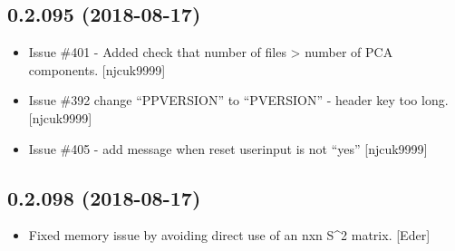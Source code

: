 \documentclass[a4paper,10pt,english]{report}
\begin{document}
\subsection{0.2.095 (2018-08-17)}
\label{\detokenize{misc/changelog:id364}}\begin{itemize}
\item {} 
Issue \#401 - Added check that number of  files \textgreater{} number of
PCA components. {[}njcuk9999{]}

\item {} 
Issue \#392 change “PPVERSION” to “PVERSION” - header key too long.
{[}njcuk9999{]}

\item {} 
Issue \#405 - add message when reset userinput is not “yes” {[}njcuk9999{]}

\end{itemize}


\subsection{0.2.098 (2018-08-17)}
\label{\detokenize{misc/changelog:id365}}\begin{itemize}
\item {} 
Fixed memory issue by avoiding direct use of an nxn S\textasciicircum{}2 matrix. {[}Eder{]}

\end{itemize}
\end{document}
